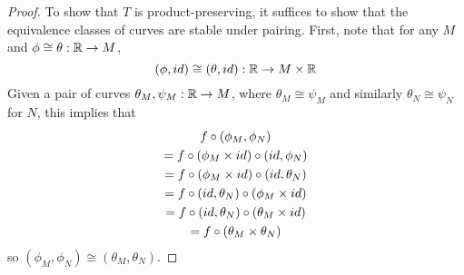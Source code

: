 \begin{proof}
    To show that $T$ is product-preserving, it suffices to show that the equivalence classes of curves are stable under pairing. First, note that for any $M$ and $\phi \cong \theta:\mathbb{R} \to M$, 
    \[
        (\phi,id) \cong (\theta,id): \mathbb{R} \to M\times\mathbb{R}
    \] 
    Given a pair of curves $\theta_M, \psi_M:\mathbb{R} \to M$, where $\theta_M \cong \psi_M$ and similarly $\theta_N \cong \psi_N$ for $N$, this implies that
    \begin{gather*}
        f \circ (\phi_M, \phi_N) \\
        = f \circ (\phi_M \times id) \circ (id, \phi_N) \\
        = f \circ (\phi_M \times id) \circ (id, \theta_N) \\
        = f \circ (id, \theta_N) \circ (\phi_M \times id) \\
        = f \circ (id, \theta_N) \circ (\theta_M \times id) \\
        = f \circ (\theta_M \times \theta_N)
    \end{gather*}
    so $(\phi_M, \phi_N) \cong (\theta_M, \theta_N)$.
\end{proof}


